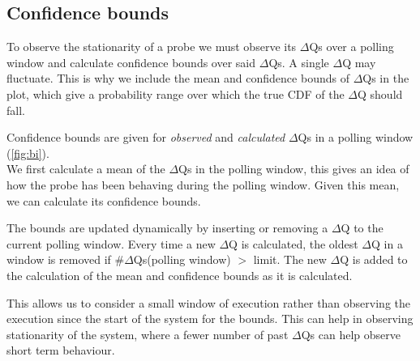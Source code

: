 \subsection{Confidence bounds}
    To observe the stationarity of a probe we must observe its $\Delta$Qs over a polling window and calculate confidence bounds over said $\Delta$Qs. A single $\Delta$Q may fluctuate. This is why we include the mean and confidence bounds of $\Delta$Qs in the plot, which give a probability range over which the true CDF of the $\Delta$Q should fall. \cite{conf-b}

    Confidence bounds are given for \textit{observed} and \textit{calculated} $\Delta$Qs in a polling window (\cref{fig:bi}). \\
    We first calculate a mean of the $\Delta$Qs in the polling window, this gives an idea of how the probe has been behaving during the polling window. Given this mean, we can calculate its confidence bounds.

    The bounds are updated dynamically by inserting or removing a $\Delta$Q to the current polling window. Every time a new $\Delta$Q is calculated, the oldest $\Delta$Q in a window is removed if \#$\Delta$Qs(polling window) $>$ limit. The new $\Delta$Q is added to the calculation of the mean and confidence bounds as it is calculated. 

    This allows us to consider a small window of execution rather than observing the execution since the start of the system for the bounds. This can help in observing stationarity of the system, where a fewer number of past $\Delta$Qs can help observe short term behaviour.

